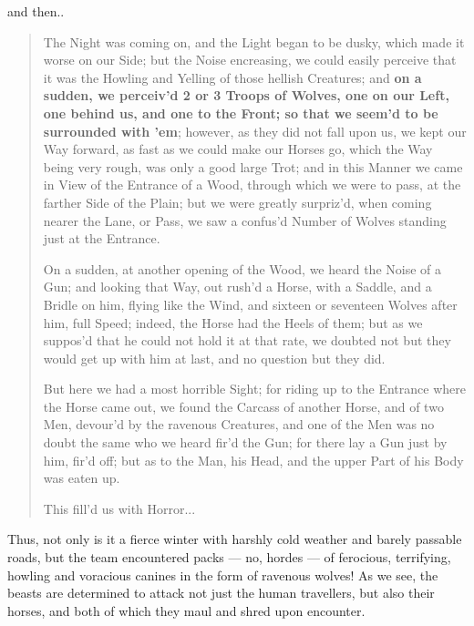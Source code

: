\documentclass[a4paper]{article}
\begin{document}
and then..




\noindent
\begin{minipage}{1\textwidth}
\vspace{1em}
\begin{quotation}
{\ttfamily


The Night was coming on, and the Light began to be dusky, which made it worse on our Side; but the Noise encreasing, we could easily perceive that it was the Howling and Yelling of those hellish Creatures; and \textbf{on a sudden, we perceiv'd 2 or 3 Troops of Wolves, one on our Left, one behind us, and one to the Front; so that we seem’d to be surrounded with ’em}; however, as they did not fall upon us, we kept our Way forward, as fast as we could make our Horses go, which the Way being very rough, was only a good large Trot; and in this Manner we came in View of the Entrance of a Wood, through which we were to pass, at the farther Side of the Plain; but we were greatly surpriz’d, when coming nearer the Lane, or Pass, we saw a confus’d Number of Wolves standing just at the Entrance.

On a sudden, at another opening of the Wood, we heard the Noise of a Gun; and looking that Way, out rush’d a Horse, with a Saddle, and a Bridle on him, flying like the Wind, and sixteen or seventeen Wolves after him, full Speed; indeed, the Horse had the Heels of them; but as we suppos’d that he could not hold it at that rate, we doubted not but they would get up with him at last, and no question but they did.

But here we had a most horrible Sight; for riding up to the Entrance where the Horse came out, we found the Carcass of another Horse, and of two Men, devour’d by the ravenous Creatures, and one of the Men was no doubt the same who we heard fir’d the Gun; for there lay a Gun just by him, fir’d off; but as to the Man, his Head, and the upper Part of his Body was eaten up.

This fill’d us with Horror...


}
\end{quotation}
\vspace{1em}
\end{minipage}



Thus, not only is it a fierce winter with harshly cold weather and barely passable roads, but the team encountered packs --- no, hordes --- of ferocious, terrifying, howling and voracious canines in the form of ravenous wolves! As we see, the beasts are determined to attack not just the human travellers, but also their horses, and both of which they maul and shred upon encounter. 
\end{document}
